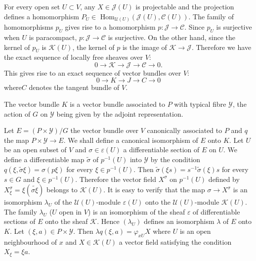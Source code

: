 For every open set $U \subset V$, any $X \in \mathcal{J}(U)$ is
projectable and the projection defines a homomorphism $P_U\in $
Hom$_{\mathscr{U}(U)}(\mathcal{J}(U), \mathscr{C}(U))$. 
The family of homomorphisms $p_U$ gives rise to a homomorphism 
$p:\mathcal{J} \to \mathscr{C}$. Since $p_U$ is surjective when $U$ is
paracompact, 
$p:\mathcal{J} \to \mathscr{C}$ is surjective. On the other hand,
since the kernel of $p_U$ is $\mathscr{K}(U)$, the kernel of $p$ is
the image of $ \mathscr{K} \to \mathcal{J}$. Therefore we have the
exact sequence of locally free sheaves over $V$:   
$$
0\to \mathscr{K} \to \mathcal{J} \to \mathscr{C} \to 0.
$$
This gives rise to an exact sequence of vector bundles over $V$:
$$
0 \to K \to J \to C \to 0
$$
where\pageoriginale $C$ denotes the tangent bundle of $V$.

\setcounter{theorem}{0}
\begin{theorem}\label{chap5:sec5:thm1}%
  The vector bundle $K$ is a vector bundle associated to $P$ with
  typical fibre $\mathscr{Y}$, the action of $G$ on $\mathscr{Y}$
  being given by the adjoint representation. 
\end{theorem}

Let $E = (P \times \mathscr{Y})/G$ the vector bundle over $V$
canonically associated to $P$ and $q$ the map $P \times \mathscr{Y}
\to E$. We shall define a canonical isomorphism of $E$ onto $K$. Let
$U$ be an open subset of $V$ and $\sigma \in \varepsilon (U)$ a
differentiable section of $E$ on $U$. We define a differentiable map
$\tilde{\sigma}$ of $p^{-1}(U)$ into $\mathscr{Y}$ by the condition
$q(\xi, \tilde{\sigma} \xi) = \sigma (p \xi)$ for every $\xi \in
p^{-1}(U)$. Then $\tilde{\sigma} (\xi s) = s^{-1} \tilde{\sigma} (\xi)s$ for
every $s \in G$ and $\xi \in p^{-1}(U)$. Therefore the vector field
$X^{\sigma}$ on $p^{-1}(U)$ defined by $X^{\sigma}_{\xi} = \xi
(\tilde{\sigma \xi})$ belongs to $\mathscr{K}(U)$. It is easy to
verify that the map $\sigma \to X^\sigma$ is an isomorphism
$\lambda_U$ of the $\mathscr{U} (U)$-module $\varepsilon (U)$ onto the
$\mathscr{U}(U)$-module $\mathscr{K}(U)$. The family $\lambda_U$ ($U$
open in $V$) is an isomorphism of the sheaf $\varepsilon$ of
differentiable sections of $E$ onto the sheaf $\mathscr{K}$. Hence
$(\lambda_U)$ defines an isomorphism $\lambda$ of $E$ onto $K$. Let
$(\xi , a) \in P \times \mathscr{Y}$. Then $\lambda q (\xi , a) =
\varphi_{x U} X$ where $U$ is an open neighbourhood of $x$ and $X \in
\mathscr{K} (U)$ a vector field satisfying the condition $X_{\xi} =
\xi a$. 

